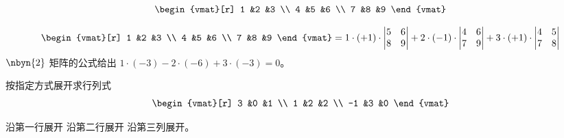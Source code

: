 \begin{exercises}
    \begin{equation*}
      \begin{vmat}[r]
         1  &2  &3  \\
         4  &5  &6  \\
         7  &8  &9
      \end{vmat}
    \end{equation*}
    \begin{answer}
      \begin{equation*}
        \begin{vmat}[r]
          1  &2  &3  \\
          4  &5  &6  \\
          7  &8  &9
        \end{vmat}=
        1\cdot(+1)\cdot
          \begin{vmatrix}
            5 &6 \\
            8 &9
          \end{vmatrix}
        +2\cdot(-1)\cdot
          \begin{vmatrix}
            4 &6 \\
            7 &9
          \end{vmatrix}
        +3\cdot(+1)\cdot
          \begin{vmatrix}
            4 &5 \\
            7 &8
          \end{vmatrix}
      \end{equation*}
      $\nbyn{2}$ 矩阵的公式给出
      $1\cdot (-3)-2\cdot (-6)+3\cdot(-3)=0$。
    \end{answer}
  \recommended \item 
    按指定方式展开求行列式
    \begin{equation*}
      \begin{vmat}[r]
         3  &0  &1  \\
         1  &2  &2  \\
        -1  &3  &0
      \end{vmat}
    \end{equation*}
    \begin{exparts*}
      \partsitem 沿第一行展开
      \partsitem 沿第二行展开
      \partsitem 沿第三列展开。
    \end{exparts*}
    \begin{answer}
\end{answer}
\end{exercises}
